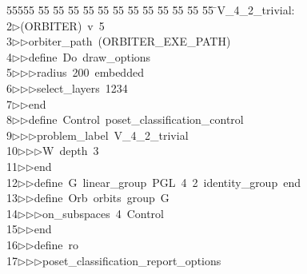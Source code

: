 %
%
\begin{tabbing}
55555 \= 55 \= 55 \= 55 \= 55 \= 55 \= 55 \= 55 \= 55 \= 55 \= 55 \= 55 \= 55 \= \>V\_4\_2\_trivial:\\[0pt]
2\>$\triangleright$\>(ORBITER)\ v\ 5\ \\[0pt]
3\>$\triangleright$\>$\triangleright$\>orbiter\_path\ (ORBITER\_EXE\_PATH)\ \\[0pt]
4\>$\triangleright$\>$\triangleright$\>define\ Do\ draw\_options\ \\[0pt]
5\>$\triangleright$\>$\triangleright$\>$\triangleright$\>radius\ 200\ embedded\ \\[0pt]
6\>$\triangleright$\>$\triangleright$\>$\triangleright$\>select\_layers\ 1234\ \\[0pt]
7\>$\triangleright$\>$\triangleright$\>end\ \\[0pt]
8\>$\triangleright$\>$\triangleright$\>define\ Control\ poset\_classification\_control\ \\[0pt]
9\>$\triangleright$\>$\triangleright$\>$\triangleright$\>problem\_label\ V\_4\_2\_trivial\ \\[0pt]
10\>$\triangleright$\>$\triangleright$\>$\triangleright$\>W\ depth\ 3\ \\[0pt]
11\>$\triangleright$\>$\triangleright$\>end\ \\[0pt]
12\>$\triangleright$\>$\triangleright$\>define\ G\ linear\_group\ PGL\ 4\ 2\ identity\_group\ end\ \\[0pt]
13\>$\triangleright$\>$\triangleright$\>define\ Orb\ orbits\ group\ G\ \\[0pt]
14\>$\triangleright$\>$\triangleright$\>$\triangleright$\>on\_subspaces\ 4\ Control\ \\[0pt]
15\>$\triangleright$\>$\triangleright$\>end\ \\[0pt]
16\>$\triangleright$\>$\triangleright$\>define\ ro\ \\[0pt]
17\>$\triangleright$\>$\triangleright$\>$\triangleright$\>poset\_classification\_report\_options\ \\[0pt]

\end{tabbing}
